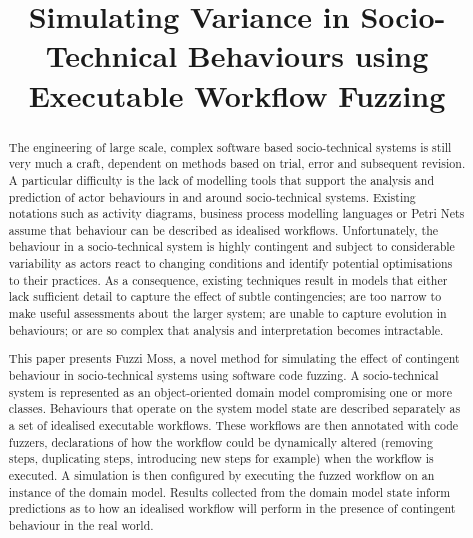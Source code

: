 \documentclass{sig-alternate}
\title{Simulating Variance in Socio-Technical Behaviours using Executable Workflow Fuzzing}
\begin{document}

\maketitle


\begin{abstract}


  The engineering of large scale, complex software based socio-technical systems is still very much a craft, dependent
  on methods based on trial, error and subsequent revision.  A particular difficulty is the lack of modelling tools that
  support the analysis and prediction of actor behaviours in and around socio-technical systems.  Existing notations
  such as activity diagrams, business process modelling languages or Petri Nets assume that behaviour can be described
  as idealised workflows.  Unfortunately, the behaviour in a socio-technical system is highly contingent and subject to
  considerable variability as actors react to changing conditions and identify potential optimisations to their
  practices.  As a consequence, existing techniques result in models that either lack sufficient detail to capture the
  effect of subtle contingencies; are too narrow to make useful assessments about the larger system; are unable to
  capture evolution in behaviours; or are so complex that analysis and interpretation becomes intractable.

  This paper presents Fuzzi Moss, a novel method for simulating the effect of contingent behaviour in socio-technical
  systems using software code fuzzing.  A socio-technical system is represented as an object-oriented domain model
  compromising one or more classes.  Behaviours that operate on the system model state are described separately as a set
  of idealised executable workflows.  These workflows are then annotated with code fuzzers, declarations of how the
  workflow could be dynamically altered (removing steps, duplicating steps, introducing new steps for example) when the
  workflow is executed.  A simulation is then configured by executing the fuzzed workflow on an instance of the domain
  model.  Results collected from the domain model state inform predictions as to how an idealised workflow will perform
  in the presence of contingent behaviour in the real world.
 

\end{abstract}
\end{document}
